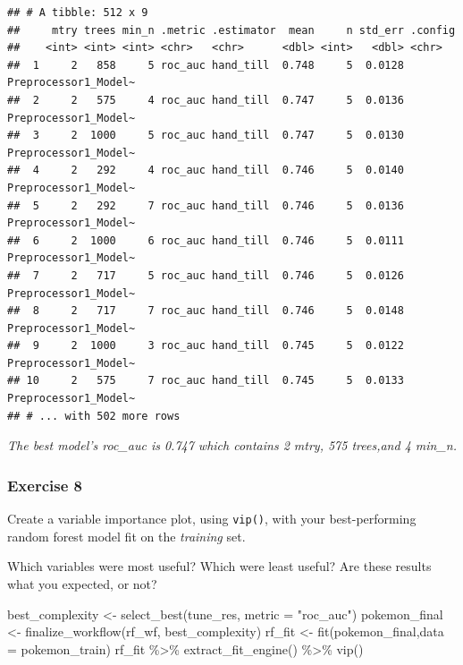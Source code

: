\documentclass[
]{article}
\newenvironment{Shaded}{\begin{snugshade}}{\end{snugshade}}
\newcommand{\AttributeTok}[1]{\textcolor[rgb]{0.77,0.63,0.00}{#1}}
\newcommand{\FunctionTok}[1]{\textcolor[rgb]{0.00,0.00,0.00}{#1}}
\newcommand{\NormalTok}[1]{#1}
\newcommand{\OtherTok}[1]{\textcolor[rgb]{0.56,0.35,0.01}{#1}}
\newcommand{\SpecialCharTok}[1]{\textcolor[rgb]{0.00,0.00,0.00}{#1}}
\newcommand{\StringTok}[1]{\textcolor[rgb]{0.31,0.60,0.02}{#1}}
\begin{document}
\begin{verbatim}
## # A tibble: 512 x 9
##     mtry trees min_n .metric .estimator  mean     n std_err .config             
##    <int> <int> <int> <chr>   <chr>      <dbl> <int>   <dbl> <chr>               
##  1     2   858     5 roc_auc hand_till  0.748     5  0.0128 Preprocessor1_Model~
##  2     2   575     4 roc_auc hand_till  0.747     5  0.0136 Preprocessor1_Model~
##  3     2  1000     5 roc_auc hand_till  0.747     5  0.0130 Preprocessor1_Model~
##  4     2   292     4 roc_auc hand_till  0.746     5  0.0140 Preprocessor1_Model~
##  5     2   292     7 roc_auc hand_till  0.746     5  0.0136 Preprocessor1_Model~
##  6     2  1000     6 roc_auc hand_till  0.746     5  0.0111 Preprocessor1_Model~
##  7     2   717     5 roc_auc hand_till  0.746     5  0.0126 Preprocessor1_Model~
##  8     2   717     7 roc_auc hand_till  0.746     5  0.0148 Preprocessor1_Model~
##  9     2  1000     3 roc_auc hand_till  0.745     5  0.0122 Preprocessor1_Model~
## 10     2   575     7 roc_auc hand_till  0.745     5  0.0133 Preprocessor1_Model~
## # ... with 502 more rows
\end{verbatim}

\emph{The best model's roc\_auc is 0.747 which contains 2 mtry, 575
trees,and 4 min\_n.}

\hypertarget{exercise-8}{%
\subsubsection{Exercise 8}\label{exercise-8}}

Create a variable importance plot, using \texttt{vip()}, with your
best-performing random forest model fit on the \emph{training} set.

Which variables were most useful? Which were least useful? Are these
results what you expected, or not?

\begin{Shaded}
\begin{Highlighting}[]
\NormalTok{best\_complexity }\OtherTok{\textless{}{-}} \FunctionTok{select\_best}\NormalTok{(tune\_res, }\AttributeTok{metric =} \StringTok{"roc\_auc"}\NormalTok{)}
\NormalTok{pokemon\_final }\OtherTok{\textless{}{-}} \FunctionTok{finalize\_workflow}\NormalTok{(rf\_wf, best\_complexity)}
\NormalTok{rf\_fit }\OtherTok{\textless{}{-}} \FunctionTok{fit}\NormalTok{(pokemon\_final,}\AttributeTok{data =}\NormalTok{ pokemon\_train)}
\NormalTok{rf\_fit }\SpecialCharTok{\%\textgreater{}\%}
  \FunctionTok{extract\_fit\_engine}\NormalTok{() }\SpecialCharTok{\%\textgreater{}\%}
  \FunctionTok{vip}\NormalTok{()}
\end{Highlighting}
\end{Shaded}
\end{document}
